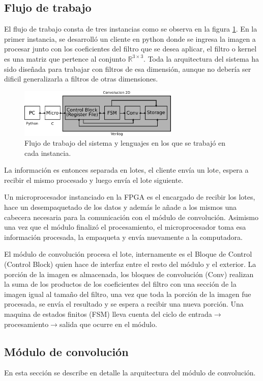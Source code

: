 \documentclass[conference,compsoc]{IEEEtran}
\begin{document}
\subsection{Flujo de trabajo}
El flujo de trabajo consta de tres instancias como se observa en la figura
\ref{fig_workflow}. En la primer instancia, se desarroll\'o un cliente en python
donde se ingresa la imagen a procesar junto con los coeficientes del filtro que
se desea aplicar, el filtro o kernel es una matriz que pertence al conjunto
$\mathbb{R}^{3{\times}3}$. Toda la arquitectura del sistema ha sido dise\~nada
para trabajar con filtros de esa dimensi\'on, aunque no deber\'ia ser dificil
generalizarla a filtros de otras dimensiones.
\begin{figure}[!t]
\centering
\includegraphics[width=3in]{workflow.pdf}
\caption{Flujo de trabajo del sistema y lenguajes en los que se trabaj\'o en
  cada instancia.}
\label{fig_workflow}
\end{figure}
La informaci\'on es entonces separada en lotes, el cliente env\'ia un
lote, espera a recibir el mismo procesado y luego env\'ia el lote siguiente.

Un microprocesador instanciado en la FPGA es el encargado de recibir los lotes,
hace un desempaquetado de los datos y adem\'as le a\~nade a los mismos una 
cabecera necesaria para la comunicaci\'on con el m\'odulo de convoluci\'on.
Asimismo una vez que el m\'odulo finaliz\'o el procesamiento, el microprocesador 
toma esa informaci\'on procesada, la empaqueta y env\'ia nuevamente a la
computadora.

El m\'odulo de convoluci\'on procesa el lote, internamente es el Bloque de
Control (Control Block) quien hace de interfaz entre el resto del m\'odulo y el
exterior. La porci\'on de la imagen es almacenada, los bloques de convoluci\'on
(Conv) realizan la suma de los productos de los coeficientes del filtro con una
secci\'on de la imagen igual al tama\~no del filtro, una vez que toda la
porci\'on de la imagen fue procesada, se env\'ia el resultado y se espera a
recibir una nueva porci\'on. Una maquina de estados finitos (FSM) lleva cuenta
del ciclo de entrada$\rightarrow$procesamiento$\rightarrow$salida que ocurre en
el m\'odulo.

\subsection{M\'odulo de convoluci\'on}
En esta secci\'on se describe en detalle la arquitectura del m\'odulo de
convoluci\'on.
\end{document}
